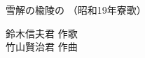 \documentclass[10pt,b5j]{tarticle} %
\begin{document}
\begin{minipage}[c]{0.7\hsize} %
    \begin{center}
        {\LARGE
            雪解の楡陵の %
        }
        {\small 
            （昭和19年寮歌） %
        }
    \end{center}
\end{minipage}
\begin{minipage}[c]{0.3\hsize} %
    \begin{flushright} %
        鈴木信夫君 作歌\\竹山賢治君 作曲 %
    \end{flushright}
\end{minipage}
\end{document}
